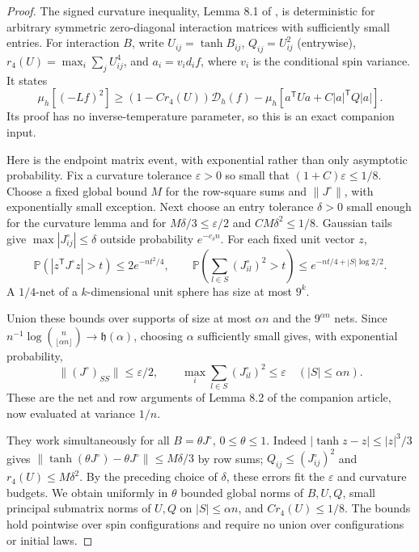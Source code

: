 \begin{proof}
The signed curvature inequality, Lemma 8.1 of
\cite{AcceptedGap}, is deterministic for arbitrary symmetric
zero-diagonal interaction matrices with sufficiently small entries.
For interaction $B$, write
$U_{ij}=\tanh B_{ij}$, $Q_{ij}=U_{ij}^2$ (entrywise),
$r_4(U)=\max_i\sum_jU_{ij}^4$, and
$a_i=v_i d_i f$, where $v_i$ is the conditional spin variance.
It states
\[
 \mu_h[(-Lf)^2]\ge(1-Cr_4(U))\mathcal D_h(f)
       -\mu_h[a^{\mathsf T}Ua+C|a|^{\mathsf T}Q|a|].
\]
Its proof has no inverse-temperature parameter, so this is an exact
companion input.

Here is the endpoint matrix event, with exponential rather than only
asymptotic probability. Fix a curvature tolerance
\(\varepsilon>0\) so small that \((1+C)\varepsilon\le1/8\).
Choose a fixed global bound \(M\) for the row-square sums and
\(\|J^\circ\|\), with exponentially small exception. Next choose
an entry tolerance \(\delta>0\) small enough for the curvature
lemma and for \(M\delta/3\le\varepsilon/2\) and
\(CM\delta^2\le1/8\). Gaussian tails give
\(\max|J^\circ_{ij}|\le\delta\) outside probability
\(e^{-c_\delta n}\). For each fixed unit vector \(z\),
\[
 \mathbb P(|z^{\mathsf T}J^\circ z|>t)\le2e^{-nt^2/4},\qquad
 \mathbb P\left(\sum_{l\in S}(J^\circ_{il})^2>t\right)
 \le e^{-nt/4+|S|\log2/2}.
\]
A $1/4$-net of a $k$-dimensional unit sphere has size at most $9^k$.

Union these bounds over supports of size at most $\alpha n$ and the
$9^{\alpha n}$ nets.  Since
$n^{-1}\log\binom n{\lfloor\alpha n\rfloor}\to\mathfrak h(\alpha)$,
choosing $\alpha$ sufficiently small gives, with exponential probability,
\[
 \|(J^\circ)_{SS}\|\le\varepsilon/2,
 \qquad \max_i\sum_{l\in S}(J^\circ_{il})^2\le\varepsilon
 \quad(|S|\le\alpha n).
\]
These are the net and row arguments of Lemma 8.2 of the companion
article, now evaluated at variance $1/n$.

They work simultaneously for all $B=\theta J^\circ$, $0\le\theta\le1$.
Indeed $|\tanh z-z|\le|z|^3/3$ gives
$\|\tanh(\theta J^\circ)-\theta J^\circ\|\le M\delta/3$ by row sums;
$Q_{ij}\le(J^\circ_{ij})^2$ and $r_4(U)\le M\delta^2$.
By the preceding choice of \(\delta\), these errors fit the
\(\varepsilon\) and curvature budgets. We obtain uniformly in
$\theta$ bounded global norms of $B,U,Q$, small principal submatrix
norms of $U,Q$ on $|S|\le\alpha n$, and $Cr_4(U)\le1/8$.
The bounds hold pointwise over spin configurations and require no
union over configurations or initial laws.


\end{proof}

